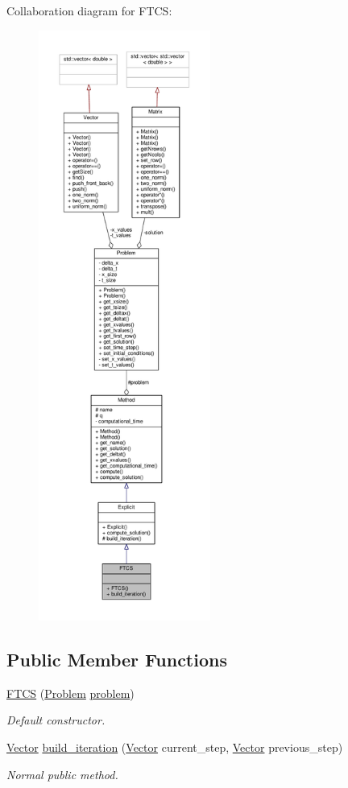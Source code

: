 Collaboration diagram for F\+T\+CS\+:
\nopagebreak
\begin{figure}[H]
\begin{center}
\leavevmode
\includegraphics[height=550pt]{classFTCS__coll__graph}
\end{center}
\end{figure}
\subsection*{Public Member Functions}
\begin{DoxyCompactItemize}
\item 
\hyperlink{classFTCS_a7a41ea5217c29d68cebf1a5e20effa8b}{F\+T\+CS} (\hyperlink{classProblem}{Problem} \hyperlink{classMethod_a29a08a679b5d30a8c813766308205041}{problem})
\begin{DoxyCompactList}\small\item\em Default constructor. \end{DoxyCompactList}\item 
\hyperlink{classVector}{Vector} \hyperlink{classFTCS_abc8074dbb5a5facaf0380aa867998556}{build\+\_\+iteration} (\hyperlink{classVector}{Vector} current\+\_\+step, \hyperlink{classVector}{Vector} previous\+\_\+step)
\begin{DoxyCompactList}\small\item\em Normal public method. \end{DoxyCompactList}\end{DoxyCompactItemize}
